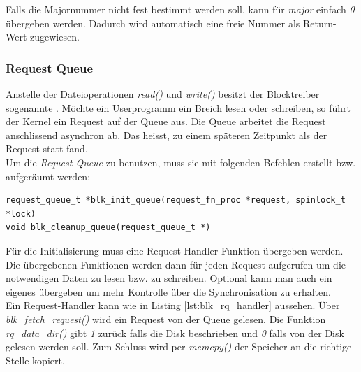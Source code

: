 Falls die Majornummer nicht fest bestimmt werden soll, kann für \emph{major} einfach \emph{0} übergeben werden. Dadurch wird automatisch eine freie Nummer als Return-Wert zugewiesen. \\

\subsubsection{Request Queue}

Anstelle der Dateioperationen \emph{read()} und \emph{write()} besitzt der Blocktreiber sogenannte . Möchte ein Userprogramm ein Breich lesen
oder schreiben, so führt der Kernel ein Request auf der Queue aus. Die Queue arbeitet die Request anschlissend asynchron ab. Das heisst, zu einem späteren Zeitpunkt als der Request
statt fand. \\

Um die \emph{Request Queue} zu benutzen, muss sie mit folgenden Befehlen erstellt bzw. aufgeräumt werden:
\begin{lstlisting}[caption=Request Queue Operationen]
request_queue_t *blk_init_queue(request_fn_proc *request, spinlock_t *lock)
void blk_cleanup_queue(request_queue_t *)
\end{lstlisting}

Für die Initialisierung muss eine Request-Handler-Funktion übergeben werden. Die übergebenen Funktionen werden dann für jeden Request aufgerufen um die notwendigen Daten zu
lesen bzw. zu schreiben. Optional kann man auch ein eigenes  übergeben um mehr Kontrolle über die Synchronisation zu erhalten. \\

Ein Request-Handler kann wie in Listing \ref{lst:blk_rq_handler} aussehen. Über \emph{blk\_fetch\_request()} wird ein Request von der Queue gelesen. Die Funktion \emph{rq\_data\_dir()}
gibt \emph{1} zurück falls die Disk beschrieben und \emph{0} falls von der Disk gelesen werden soll. Zum Schluss wird per \emph{memcpy()} der Speicher an die richtige Stelle kopiert.

